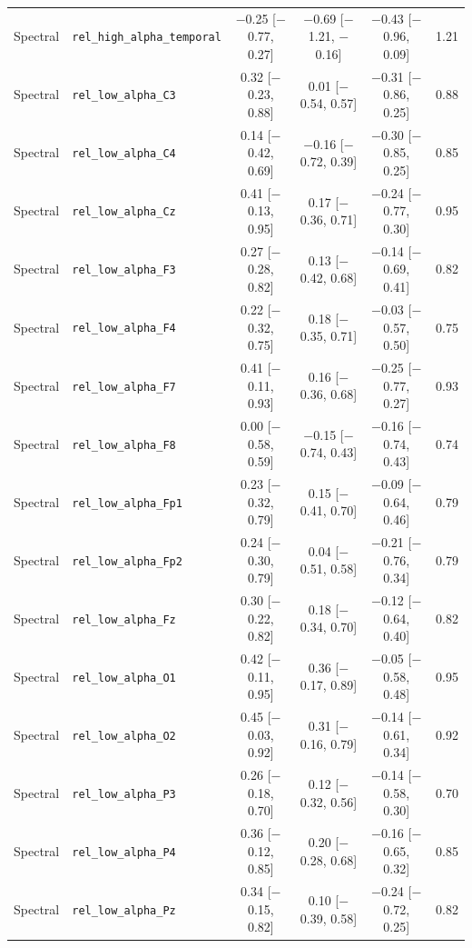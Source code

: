 {\begin{longtable}{llcccc}
Spectral & \texttt{rel\_high\_alpha\_temporal} & $-$0.25 [$-$0.77, 0.27] & $-$0.69 [$-$1.21, $-$0.16] & $-$0.43 [$-$0.96, 0.09] & 1.21 \\
Spectral & \texttt{rel\_low\_alpha\_C3} & 0.32 [$-$0.23, 0.88] & 0.01 [$-$0.54, 0.57] & $-$0.31 [$-$0.86, 0.25] & 0.88 \\
Spectral & \texttt{rel\_low\_alpha\_C4} & 0.14 [$-$0.42, 0.69] & $-$0.16 [$-$0.72, 0.39] & $-$0.30 [$-$0.85, 0.25] & 0.85 \\
Spectral & \texttt{rel\_low\_alpha\_Cz} & 0.41 [$-$0.13, 0.95] & 0.17 [$-$0.36, 0.71] & $-$0.24 [$-$0.77, 0.30] & 0.95 \\
Spectral & \texttt{rel\_low\_alpha\_F3} & 0.27 [$-$0.28, 0.82] & 0.13 [$-$0.42, 0.68] & $-$0.14 [$-$0.69, 0.41] & 0.82 \\
Spectral & \texttt{rel\_low\_alpha\_F4} & 0.22 [$-$0.32, 0.75] & 0.18 [$-$0.35, 0.71] & $-$0.03 [$-$0.57, 0.50] & 0.75 \\
Spectral & \texttt{rel\_low\_alpha\_F7} & 0.41 [$-$0.11, 0.93] & 0.16 [$-$0.36, 0.68] & $-$0.25 [$-$0.77, 0.27] & 0.93 \\
Spectral & \texttt{rel\_low\_alpha\_F8} & 0.00 [$-$0.58, 0.59] & $-$0.15 [$-$0.74, 0.43] & $-$0.16 [$-$0.74, 0.43] & 0.74 \\
Spectral & \texttt{rel\_low\_alpha\_Fp1} & 0.23 [$-$0.32, 0.79] & 0.15 [$-$0.41, 0.70] & $-$0.09 [$-$0.64, 0.46] & 0.79 \\
Spectral & \texttt{rel\_low\_alpha\_Fp2} & 0.24 [$-$0.30, 0.79] & 0.04 [$-$0.51, 0.58] & $-$0.21 [$-$0.76, 0.34] & 0.79 \\
Spectral & \texttt{rel\_low\_alpha\_Fz} & 0.30 [$-$0.22, 0.82] & 0.18 [$-$0.34, 0.70] & $-$0.12 [$-$0.64, 0.40] & 0.82 \\
Spectral & \texttt{rel\_low\_alpha\_O1} & 0.42 [$-$0.11, 0.95] & 0.36 [$-$0.17, 0.89] & $-$0.05 [$-$0.58, 0.48] & 0.95 \\
Spectral & \texttt{rel\_low\_alpha\_O2} & 0.45 [$-$0.03, 0.92] & 0.31 [$-$0.16, 0.79] & $-$0.14 [$-$0.61, 0.34] & 0.92 \\
Spectral & \texttt{rel\_low\_alpha\_P3} & 0.26 [$-$0.18, 0.70] & 0.12 [$-$0.32, 0.56] & $-$0.14 [$-$0.58, 0.30] & 0.70 \\
Spectral & \texttt{rel\_low\_alpha\_P4} & 0.36 [$-$0.12, 0.85] & 0.20 [$-$0.28, 0.68] & $-$0.16 [$-$0.65, 0.32] & 0.85 \\
Spectral & \texttt{rel\_low\_alpha\_Pz} & 0.34 [$-$0.15, 0.82] & 0.10 [$-$0.39, 0.58] & $-$0.24 [$-$0.72, 0.25] & 0.82 \\

\end{longtable}}
